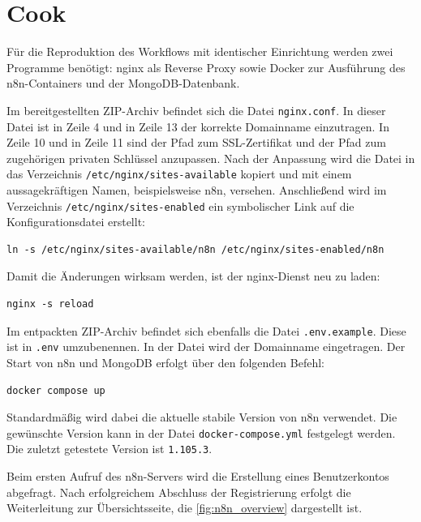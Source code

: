 \section{Cook}\label{sec:cook} %

Für die Reproduktion des Workflows mit identischer Einrichtung werden zwei Programme benötigt: nginx
als Reverse Proxy sowie Docker zur Ausführung des n8n-Containers und der MongoDB-Datenbank.

Im bereitgestellten ZIP-Archiv befindet sich die Datei \verb|nginx.conf|. In dieser Datei ist in Zeile 4
und in Zeile 13 der korrekte Domainname einzutragen. In Zeile 10 und in Zeile 11 sind der Pfad zum
SSL-Zertifikat und der Pfad zum zugehörigen privaten Schlüssel anzupassen. Nach der Anpassung wird
die Datei in das Verzeichnis \verb|/etc/nginx/sites-available| kopiert und mit einem aussagekräftigen
Namen, beispielsweise n8n, versehen. Anschließend wird im Verzeichnis
\verb|/etc/nginx/sites-enabled| ein
symbolischer Link auf die Konfigurationsdatei erstellt:

\begin{verbatim}
ln -s /etc/nginx/sites-available/n8n /etc/nginx/sites-enabled/n8n
\end{verbatim}

Damit die Änderungen wirksam werden, ist der nginx-Dienst neu zu laden:

\begin{verbatim}
nginx -s reload
\end{verbatim}

Im entpackten ZIP-Archiv befindet sich ebenfalls die Datei \verb|.env.example|. Diese ist in
\verb|.env| umzubenennen. In der Datei wird der Domainname eingetragen. Der Start von n8n und
MongoDB erfolgt über den folgenden Befehl:

\begin{verbatim}
docker compose up
\end{verbatim}

Standardmäßig wird dabei die aktuelle stabile Version von n8n verwendet. Die gewünschte Version kann
in der Datei \verb|docker-compose.yml| festgelegt werden. Die zuletzt getestete Version ist
\verb|1.105.3|.

Beim ersten Aufruf des n8n-Servers wird die Erstellung eines Benutzerkontos abgefragt. Nach
erfolgreichem Abschluss der Registrierung erfolgt die Weiterleitung zur Übersichtsseite, die
\autoref{fig:n8n_overview} dargestellt ist.

